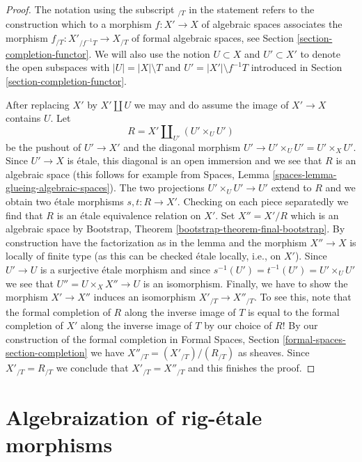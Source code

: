 \begin{proof}
The notation using the subscript ${}_{/T}$ in the statement refers to the
construction which to a morphism $f : X' \to X$ of algebraic spaces
associates the morphism $f_{/T} : X'_{/f^{-1}T} \to X_{/T}$ of formal
algebraic spaces, see Section \ref{section-completion-functor}.
We will also use the notion $U \subset X$ and $U' \subset X'$ to denote
the open subspaces with $|U| = |X| \setminus T$ and
$U' = |X'| \setminus f^{-1}T$ introduced in
Section \ref{section-completion-functor}.

\medskip\noindent
After replacing $X'$ by $X' \amalg U$ we may and do assume
the image of $X' \to X$ contains $U$.
Let
$$
R = X' \amalg_{U'} (U' \times_U U')
$$
be the pushout of $U' \to X'$ and the diagonal morphism
$U' \to U' \times_U U' = U' \times_X U'$. Since $U' \to X$ is \'etale,
this diagonal is an open immersion and we see that $R$ is an algebraic space
(this follows for example from
Spaces, Lemma \ref{spaces-lemma-glueing-algebraic-spaces}).
The two projections $U' \times_U U' \to U'$ extend to $R$
and we obtain two \'etale morphisms $s, t : R \to X'$.
Checking on each piece separatedly we find that $R$
is an \'etale equivalence relation on $X'$. Set $X'' = X'/R$
which is an algebraic space by
Bootstrap, Theorem \ref{bootstrap-theorem-final-bootstrap}.
By construction have the factorization as in the lemma and
the morphism $X'' \to X$ is locally of finite type (as this
can be checked \'etale locally, i.e., on $X'$).
Since $U' \to U$ is a surjective \'etale morphism
and since $s^{-1}(U') = t^{-1}(U') = U' \times_U U'$
we see that $U'' = U \times_X X'' \to U$ is an isomorphism.
Finally, we have to show the morphism $X' \to X''$ induces an isomorphism
$X'_{/T} \to X''_{/T}$. To see this, note that the formal completion of $R$
along the inverse image of $T$ is equal to the formal completion of
$X'$ along the inverse image of $T$ by our choice of $R$! By
our construction of the formal completion in
Formal Spaces, Section \ref{formal-spaces-section-completion}
we have $X''_{/T} = (X'_{/T}) / (R_{/T})$ as sheaves. Since
$X'_{/T} = R_{/T}$ we conclude that $X'_{/T} = X''_{/T}$
and this finishes the proof.
\end{proof}








\section{Algebraization of rig-\'etale morphisms}
\label{section-algebraization}


